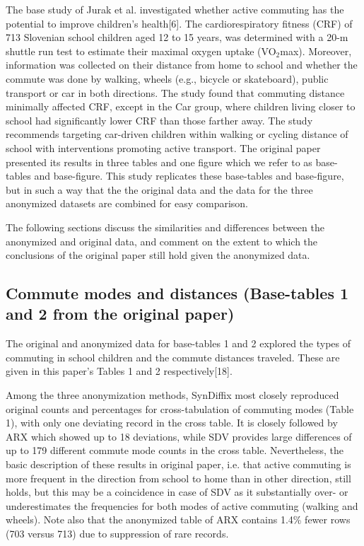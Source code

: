 \documentclass[10pt]{article}
\newcommand{\mycite}[1]{[#1]}
\begin{document}
The base study of Jurak et al. investigated whether active commuting has the potential to improve children’s health\mycite{6}. The cardiorespiratory fitness (CRF) of 713 Slovenian school children aged 12 to 15 years, was determined with a 20-m shuttle run test to estimate their maximal oxygen uptake (VO$_2$max). Moreover, information was collected on their distance from home to school and whether the commute was done by walking, wheels (e.g., bicycle or skateboard), public transport or car in both directions. The study found that commuting distance minimally affected CRF, except in the Car group, where children living closer to school had significantly lower CRF than those farther away. The study recommends targeting car-driven children within walking or cycling distance of school with interventions promoting active transport. The original paper presented its results in three tables and one figure which we refer to as base-tables and base-figure. This study replicates these base-tables and base-figure, but in such a way that the the original data and the data for the three anonymized datasets are combined for easy comparison.

The following sections discuss the similarities and differences between the anonymized and original data, and comment on the extent to which the conclusions of the original paper still hold given the anonymized data.

\subsection*{Commute modes and distances (Base-tables 1 and 2 from the original paper)}

The original and anonymized data for base-tables 1 and 2 explored the types of commuting in school children and the commute distances traveled. These are given in this paper's Tables 1 and 2 respectively\mycite{18}. 

Among the three anonymization methods, SynDiffix most closely reproduced original counts and percentages for cross-tabulation of commuting modes (Table 1), with only one deviating record in the cross table. It is closely followed by ARX which showed up to 18 deviations, while SDV provides large differences of up to 179 different commute mode counts in the cross table. Nevertheless, the basic description of these results in original paper, i.e. that active commuting is more frequent in the direction from school to home than in other direction, still holds, but this may be a coincidence in case of SDV as it substantially over- or underestimates the frequencies for both modes of active commuting (walking and wheels). Note also that the anonymized table of ARX contains 1.4\% fewer rows (703 versus 713) due to suppression of rare records.
\end{document}
